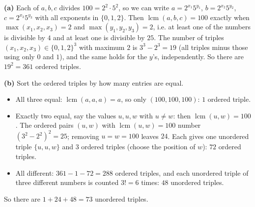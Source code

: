 \textbf{(a)} Each of $a,b,c$ divides $100=2^2\cdot5^2$, so we can write $a=2^{x_1}5^{y_1}$, $b=2^{x_2}5^{y_2}$, $c=2^{x_3}5^{y_3}$ with all exponents in $\{0,1,2\}$. Then $\operatorname{lcm}(a,b,c)=100$ exactly when $\max(x_1,x_2,x_3)=2$ and $\max(y_1,y_2,y_3)=2$, i.e. at least one of the numbers is divisible by $4$ and at least one is divisible by $25$. The number of triples $(x_1,x_2,x_3)\in\{0,1,2\}^3$ with maximum $2$ is $3^3-2^3=19$ (all triples minus those using only $0$ and $1$), and the same holds for the $y$'s, independently. So there are $19^2=\boxed{361}$ ordered triples.

\textbf{(b)} Sort the ordered triples by how many entries are equal.
\begin{itemize}
\item All three equal: $\operatorname{lcm}(a,a,a)=a$, so only $(100,100,100)$: $1$ ordered triple.
\item Exactly two equal, say the values $u,u,w$ with $u\ne w$: then $\operatorname{lcm}(u,w)=100$. The ordered pairs $(u,w)$ with $\operatorname{lcm}(u,w)=100$ number $(3^2-2^2)^2=25$; removing $u=w=100$ leaves $24$. Each gives one unordered triple $\{u,u,w\}$ and $3$ ordered triples (choose the position of $w$): $72$ ordered triples.
\item All different: $361-1-72=288$ ordered triples, and each unordered triple of three different numbers is counted $3!=6$ times: $48$ unordered triples.
\end{itemize}
So there are $1+24+48=\boxed{73}$ unordered triples.
